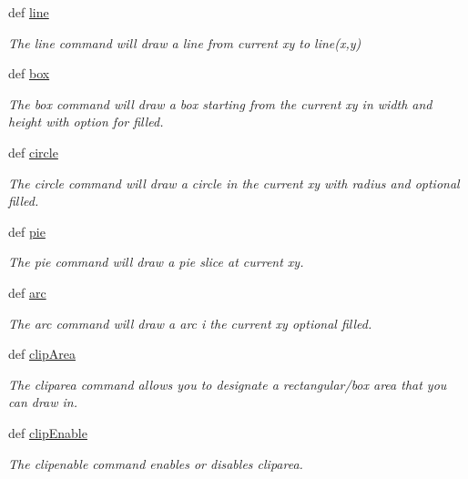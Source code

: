 \begin{DoxyCompactItemize}
def \hyperlink{group___drawing_ga4ea7514be57c8e20f3d15fa14cf2ddf4}{line}
\begin{DoxyCompactList}\small\item\em The line command will draw a line from current xy to line(x,y) \end{DoxyCompactList}\item 
def \hyperlink{group___drawing_gad107700161c2d7c46ed973ada854c9a0}{box}
\begin{DoxyCompactList}\small\item\em The box command will draw a box starting from the current xy in width and height with option for filled. \end{DoxyCompactList}\item 
def \hyperlink{group___drawing_ga5820b906de6cabef82914dfab0c543e2}{circle}
\begin{DoxyCompactList}\small\item\em The circle command will draw a circle in the current xy with radius and optional filled. \end{DoxyCompactList}\item 
def \hyperlink{group___drawing_gadc61344b718ac7728cad63f85a9712d5}{pie}
\begin{DoxyCompactList}\small\item\em The pie command will draw a pie slice at current xy. \end{DoxyCompactList}\item 
def \hyperlink{group___drawing_gac515d84e432747e244699747380556ea}{arc}
\begin{DoxyCompactList}\small\item\em The arc command will draw a arc i the current xy optional filled. \end{DoxyCompactList}\item 
def \hyperlink{group___drawing_ga5615763ecf3b2d679d4f4a6e0ac14244}{clip\-Area}
\begin{DoxyCompactList}\small\item\em The cliparea command allows you to designate a rectangular/box area that you can draw in. \end{DoxyCompactList}\item 
def \hyperlink{group___drawing_ga3859a82b98a732f214ca4e94bf90e16a}{clip\-Enable}
\begin{DoxyCompactList}\small\item\em The clipenable command enables or disables cliparea. \end{DoxyCompactList}\item 

\end{DoxyCompactItemize}
